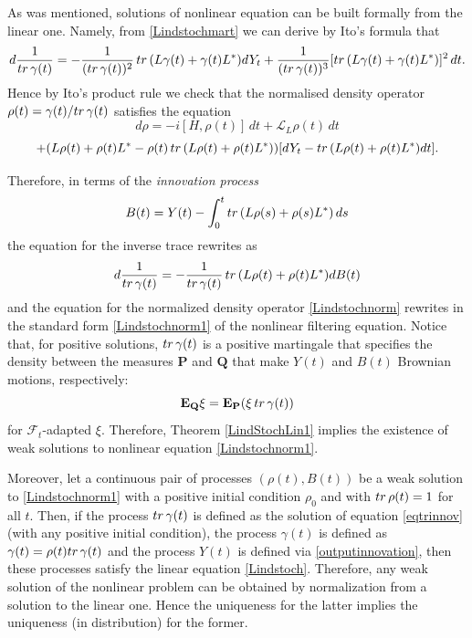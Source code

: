 \documentclass[10pt,a4paper]{amsart}
\def\LC{\mathcal{L}}
\def\FC{\mathcal{F}}
\def\E{\mathbf{E}}
\def\P{\mathbf{P}}
\def\Q{\mathbf{Q}}
\def\tr{\rm{tr}}
\def\ga{\gamma}
\begin{document}
As was mentioned, solutions of nonlinear equation can be built
formally from the linear one. Namely, from \eqref{Lindstochmart}
we can derive by Ito's formula that
\[
d\frac{1}{{\tr} \, \ga(t)}=-\frac{1}{({\tr} \, \ga(t))^2} \, {\tr} \, (L\ga(t) +\ga(t) L^*) dY_t
+\frac{1}{({\tr} \, \ga(t))^3} [{\tr} \, (L\ga(t)+\ga(t) L^*)]^2 \, dt.
\]
Hence by Ito's product rule we check that the normalised density operator
$\rho(t)=\ga(t)/{\tr} \, \ga(t)$ satisfies the equation
 \[
d\rho=-i[H, \rho(t)] \, dt +\LC_L \rho(t)\, dt
\]
 \begin{equation}
\label{Lindstochnorm}
+(L\rho(t)+\rho(t) L^*-\rho(t)\, {\tr} \, (L\rho(t)+\rho(t) L^*) )
[dY_t-{\tr} \, (L\rho(t)+\rho(t) L^*) dt].
\end{equation}

Therefore, in terms of the {\it innovation process}
 \begin{equation}
\label{outputinnovation}
B(t)=Y(t)-\int_0^t {\tr} \, (L\rho(s)+\rho(s) L^*) \, ds
\end{equation}
 the equation for the inverse trace rewrites as
  \begin{equation}
\label{eqtrinnov}
d\frac{1}{{\tr} \, \ga(t)}
=-\frac{1}{{\tr} \, \ga(t)} \, {\tr} \, (L\rho(t) +\rho(t) L^*) dB(t)
\end{equation}
and the equation for the normalized density operator \eqref{Lindstochnorm} rewrites in the
standard form \eqref{Lindstochnorm1} of the nonlinear filtering equation.
 Notice that, for positive solutions, ${\tr} \, \ga(t)$ is a positive martingale
 that specifies the density between the measures $\P$ and $\Q$ that make $Y(t)$
 and $B(t)$ Brownian motions, respectively:
\[
\E_{\Q}\xi=\E_{\P}(\xi \, {\tr}\, \ga(t))
\]
for $\FC_t$-adapted $\xi$.
Therefore, Theorem \ref{LindStochLin1} implies the existence of
weak solutions to nonlinear equation \eqref{Lindstochnorm1}.

Moreover, let a continuous pair of processes $(\rho(t), B(t))$ be a
weak solution to \eqref{Lindstochnorm1} with a positive initial condition
$\rho_0$ and with ${\tr}\, \rho(t)=1$ for all $t$. Then,
if the process ${\tr }\, \ga(t)$ is defined as the solution of equation \eqref{eqtrinnov}
(with any positive initial condition), the process
$\ga(t)$ is defined as $\ga(t)= \rho(t) {\tr }\, \ga(t)$ and the process
$Y(t)$ is defined via \eqref{outputinnovation}, then these processes satisfy
the linear equation \eqref{Lindstoch}. Therefore, any weak solution of the
nonlinear problem can be obtained by normalization from a solution to the linear one.
Hence the uniqueness for the latter implies the uniqueness (in distribution) for the former.
\end{document}
